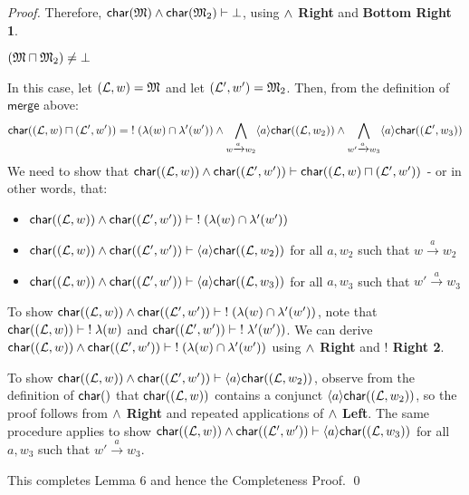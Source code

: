 \begin{proof}
Therefore,  $  \mathsf{char}(\frak{M}) \land  \mathsf{char}(\frak{M}_2) \vdash \bot$, using  {\bf $\land$ Right} and  {\bf Bottom Right 1}.
\begin{mycase}
$(\frak{M} \sqcap \frak{M}_2) \neq \bot$
\end{mycase}
In this case, let $(\mathcal{L},w) = \frak{M}$ and let $(\mathcal{L}',w')=\frak{M}_2$.
Then, from the definition of $\mathsf{merge}$ above:
\[
 \mathsf{char}((\mathcal{L},w) \sqcap (\mathcal{L}',w')) = \; ! \; (\lambda(w) \cap \lambda'(w')) \land \bigwedge_{w \xrightarrow{a} w_2} \langle a \rangle  \mathsf{char}((\mathcal{L}, w_2)) \land \bigwedge_{w' \xrightarrow{a} w_3} \langle a \rangle  \mathsf{char}((\mathcal{L}', w_3))
\]
We need to show that $ \mathsf{char}((\mathcal{L},w)) \land  \mathsf{char}((\mathcal{L}',w')) \vdash  \mathsf{char}((\mathcal{L},w) \sqcap (\mathcal{L}',w'))$ - or in other words, that:
\begin{itemize}
\item
$ \mathsf{char}((\mathcal{L},w)) \land  \mathsf{char}((\mathcal{L}',w')) \vdash \; ! \; (\lambda(w) \cap \lambda'(w'))$
\item
$ \mathsf{char}((\mathcal{L},w)) \land  \mathsf{char}((\mathcal{L}',w')) \vdash \langle a \rangle  \mathsf{char}((\mathcal{L}, w_2))$ for all $a,w_2$ such that $w \xrightarrow{a} w_2$
\item
$ \mathsf{char}((\mathcal{L},w)) \land  \mathsf{char}((\mathcal{L}',w')) \vdash \langle a \rangle  \mathsf{char}((\mathcal{L}, w_3))$ for all $a,w_3$ such that $w' \xrightarrow{a} w_3$
\end{itemize}
To show $ \mathsf{char}((\mathcal{L},w)) \land  \mathsf{char}((\mathcal{L}',w')) \vdash \; ! \; (\lambda(w) \cap \lambda'(w'))$, note that $ \mathsf{char}((\mathcal{L},w))  \vdash \; ! \; \lambda(w)$ and $ \mathsf{char}((\mathcal{L}',w')) \vdash \; ! \;  \lambda'(w'))$.
We can derive $ \mathsf{char}((\mathcal{L},w)) \land  \mathsf{char}((\mathcal{L}',w')) \vdash \; ! \; (\lambda(w) \cap \lambda'(w'))$ using {\bf $\land$ Right} and {\bf $!$ Right 2}. 

To show $ \mathsf{char}((\mathcal{L},w)) \land  \mathsf{char}((\mathcal{L}',w')) \vdash \langle a \rangle  \mathsf{char}((\mathcal{L}, w_2))$, observe from the definition of $ \CHAR$ that $ \mathsf{char}((\mathcal{L},w))$ contains a conjunct $\langle a \rangle  \mathsf{char}((\mathcal{L}, w_2))$, so the proof follows from  {\bf $\land$ Right} and repeated applications of  {\bf $\land$ Left}. The same procedure applies to show $ \mathsf{char}((\mathcal{L},w)) \land  \mathsf{char}((\mathcal{L}',w')) \vdash \langle a \rangle  \mathsf{char}((\mathcal{L}, w_3))$ for all $a,w_3$ such that $w' \xrightarrow{a} w_3$.

This completes Lemma 6 and hence the Completeness Proof.
\qed

\end{proof}
